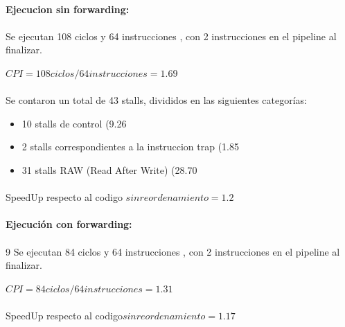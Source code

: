 \documentclass[a4paper,11pt]{article}
\begin{document}
\begin{enumerate}
\paragraph{Ejecucion sin forwarding:}

\paragraph{}
Se ejecutan 108 ciclos y 64 instrucciones , con 2 instrucciones en el  pipeline al finalizar.

\begin{center}
$CPI = 108 ciclos / 64 instrucciones = 1.69 $
\end{center}

\paragraph{}

Se contaron un total de 43 stalls, divididos en las siguientes categor\'ias:

\begin{itemize}
 \item 10 stalls de control (9.26%
 \item  2  stalls correspondientes a la instruccion trap (1.85%
 \item  31 stalls RAW (Read After Write) (28.70%
\end{itemize}

\paragraph{}
SpeedUp respecto al codigo $sin reordenamiento = 1.2$

\paragraph{Ejecuci\'on con forwarding:}

\paragraph{}9
Se ejecutan 84 ciclos y 64 instrucciones , con 2 instrucciones en el  pipeline al finalizar.

\begin{center}
$CPI = 84 ciclos / 64 instrucciones = 1.31$
\end{center}

\paragraph{}
SpeedUp respecto al codigo$ sin reordenamiento = 1.17$


\end{enumerate}
\end{document}
